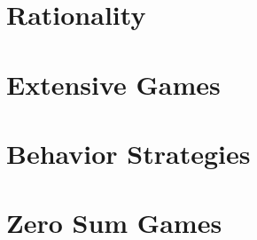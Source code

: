 \documentclass[pt11,a4paper,twoside,reqno,openright]{book}
\begin{document}
\chapter{Rationality}
	

\chapter{Extensive Games}
		

\chapter{Behavior Strategies}
		

\chapter{Zero Sum Games}
	
\end{document}
